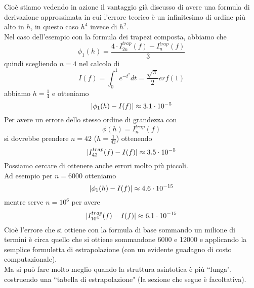 \documentclass[12pt,a4paper]{article}
\DeclarePairedDelimiter{\abs}{\lvert}{\rvert}
\begin{document}
Cioè stiamo vedendo in azione
il vantaggio già discusso di avere una formula di derivazione approssimata in cui l'errore teorico è un infinitesimo di ordine più alto in $h$, in questo caso $h^4$ invece di $h^2$.\\
Nel caso dell'esempio con la formula dei trapezi composta, abbiamo che
\[\phi_1(h) = \frac{4 \cdot I_{2n}^{trap}(f) - I_n^{trap}(f)}{3}\]
quindi scegliendo $n = 4$ nel calcolo di
\[I(f) = \int_0^1 e^{-t^2} dt = \frac{\sqrt{\pi}}{2} erf (1)\]
abbiamo $h = \frac{1}{4}$ e otteniamo
\[\abs{\phi_1(h) - I(f)} \approx 3.1 \cdot 10^{-5}\]
Per avere un errore dello stesso ordine di grandezza con 
\[\phi(h) = I_n^{trap} (f)\]
si dovrebbe prendere $n=42$ ($h=\frac{1}{42}$) ottenendo
\[\abs{I_{42}^{trap}(f) - I(f)} \approx 3.5 \cdot 10^{-5}\]
Possiamo cercare di ottenere anche errori molto più piccoli.\\
Ad esempio per $n=6000$ otteniamo
\[\abs{\phi_1(h) - I(f)} \approx 4.6 \cdot 10^{-15}\]
mentre serve $n = 10^6$ per avere
\[\abs{I_{10^6}^{trap}(f) - I(f)} \approx 6.1 \cdot 10^{-15}\]
Cioè l'errore che si ottiene con la formula di base sommando un milione di termini è circa quello che si ottiene sommandone 6000 e  12000 e applicando la semplice formuletta di estrapolazione (con un evidente guadagno di costo computazionale).\\
Ma si può fare molto meglio quando la struttura asintotica è più ``lunga", costruendo una ``tabella di estrapolazione" (la sezione che segue è facoltativa).
\end{document}
